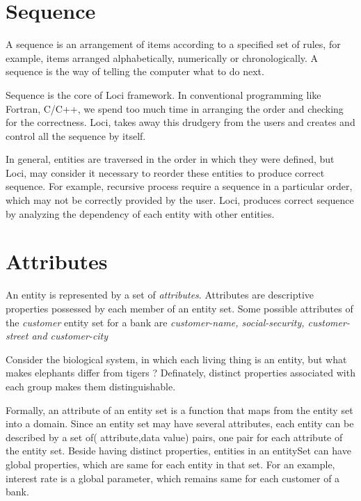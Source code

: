 \section { Sequence }
A sequence is an arrangement of items according to a specified set of rules, for
example, items arranged alphabetically, numerically or chronologically. A sequence
is the way of telling the computer what to do next.

\par Sequence is the core of Loci framework. In conventional programming like
Fortran, C/C++, we spend too much time in arranging the order and checking for
the correctness. Loci, takes away this drudgery from the users and creates and
control all the sequence by itself.

In general, entities are traversed in the order in which they were defined, but
Loci, may consider it necessary to reorder these entities to produce correct
sequence. For example, recursive process require a sequence in a particular
order, which may not be correctly provided by the user. Loci, produces 
correct sequence by analyzing the dependency of each entity with other entities.

\section { Attributes }
An entity is represented by a set of {\em attributes}. Attributes are descriptive
properties possessed by each member of an entity set.  Some possible attributes
of the {\em customer } entity set for a bank are {\em customer-name, 
social-security, customer-street and customer-city }

\par Consider the biological system, in which each living thing is an entity,
but what makes elephants differ from tigers ? Definately, distinct properties
associated with each group makes them distinguishable. 

%
\par Formally, an attribute of an entity set is a function that maps from the entity
set into a domain. Since an entity set may have several attributes, each entity
can be described by a set of( attribute,data value) pairs, one pair for 
each attribute of the entity set. 
%
Beside having distinct properties, entities in an entitySet can have global
properties, which are same for each entity in that set. For an example, 
interest rate is a global parameter, which remains same for each customer
of a bank. 

